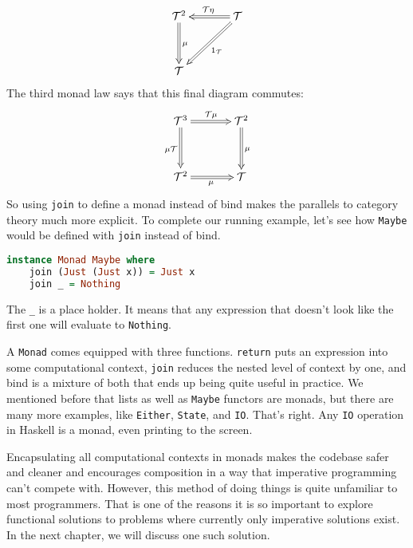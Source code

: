 \documentclass[MS, xcolor=dvipsnames]{wfuthesis}
\def\cT{\mathcal{T}}
\theoremstyle{definition}
\begin{document}
\[ \SelectTips{cm}{}\xymatrix@R+1pc@C+1pc{
  \cT^2 \ar@{=>}[d]^\mu & \cT \ar@{=>}[l]_{\cT\eta} \ar@{=>}[dl]^{1_\cT} \\ \cT &
} \]
The third monad law says that this final diagram commutes:
\[ \SelectTips{cm}{}\xymatrix@R+1pc@C+1pc{
  \cT^3 \ar@{=>}[r]^{\cT\mu} \ar@{=>}[d]_{\mu \cT} & \cT^2 \ar@{=>}[d]^\mu \\ \cT^2 \ar@{=>}[r]_\mu & \cT
} \]
So using \lstinline{join} to define a monad instead of bind makes the parallels to category theory much more explicit. To complete our running example, let's see how \lstinline{Maybe} would be defined with \lstinline{join} instead of bind.
\begin{lstlisting}[language=Haskell]
instance Monad Maybe where
    join (Just (Just x)) = Just x
    join _ = Nothing
\end{lstlisting}
The \lstinline{_} is a place holder. It means that any expression that doesn't look like the first one will evaluate to \lstinline{Nothing}. \par 
A \lstinline{Monad} comes equipped with three functions. \lstinline{return} puts an expression into some computational context, \lstinline{join} reduces the nested level of context by one, and bind is a mixture of both that ends up being quite useful in practice. We mentioned before that lists as well as \lstinline{Maybe} functors are monads, but there are many more examples, like \lstinline{Either}, \lstinline{State}, and \lstinline{IO}. That's right. Any \lstinline{IO} operation in Haskell is a monad, even printing to the screen. \par 
Encapsulating all computational contexts in monads makes the codebase safer and cleaner and encourages composition in a way that imperative programming can't compete with. However, this method of doing things is quite unfamiliar to most programmers. That is one of the reasons it is so important to explore functional solutions to problems where currently only imperative solutions exist. In the next chapter, we will discuss one such solution. 
\end{document}

